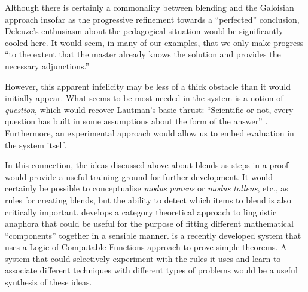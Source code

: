 Although there is certainly a commonality between blending and the
Galoisian approach insofar as the progressive refinement towards a
``perfected'' conclusion, Deleuze's enthusiasm about the pedagogical
situation would be significantly cooled here.  It would seem, in many
of our examples, that we only make progress ``to the extent that the
master already knows the solution and provides the necessary
adjunctions.''

However, this apparent infelicity may be less of a thick obstacle than
it would initially appear.  What seems to be most needed in the system
is a notion of \emph{question}, which would recover Lautman's basic
thrust: ``Scientific or not, every question has built in some
assumptions about the form of the answer'' \cite{larvor2011albert}.
Furthermore, an experimental approach would allow us to embed
evaluation in the system itself.  

In this connection, the ideas discussed above about blends as steps in
a proof would provide a useful training ground for further
development.  It would certainly be possible to conceptualise
\emph{modus ponens} or \emph{modus tollens}, etc., as rules for
creating blends, but the ability to detect which items to blend is
also critically important.  \cite{AbrSad14} develops a category
theoretical approach to linguistic anaphora that could be useful for
the purpose of fitting different mathematical ``components'' together
in a sensible manner.  \cite{DBLP:journals/corr/GanesalingamG13} is a
recently developed system that uses a Logic of Computable Functions
approach to prove simple theorems.  A system that could selectively
experiment with the rules it uses and learn to associate different
techniques with different types of problems would be a useful
synthesis of these ideas.

